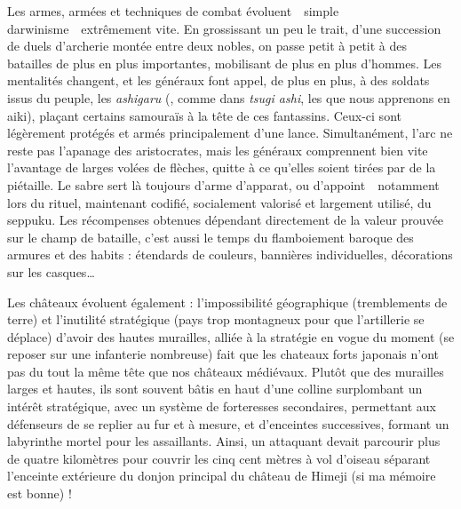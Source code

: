 Les armes, armées et techniques de combat évoluent~\incise~simple
darwinisme~\incise~extrêmement vite. En grossissant un peu le trait, d'une
succession de duels d'archerie montée entre deux nobles, on passe petit à petit
à des batailles de plus en plus importantes, mobilisant de plus en plus
d'hommes. Les mentalités changent, et les généraux font appel, de plus en plus,
à des soldats issus du peuple, les \emph{ashigaru} (, comme
dans \emph{tsugi ashi}, les  que nous apprenons en aiki),
plaçant certains samouraïs à la tête de ces fantassins. Ceux-ci sont légèrement
protégés et armés principalement d'une lance. Simultanément, l'arc ne reste pas
l'apanage des aristocrates, mais les généraux comprennent bien vite l'avantage
de larges volées de flèches, quitte à ce qu'elles soient tirées par de la
piétaille. Le sabre sert là toujours d'arme d'apparat, ou
d'appoint~\incise~notamment lors du rituel, maintenant codifié, socialement
valorisé et largement utilisé, du seppuku. Les récompenses obtenues dépendant
directement de la valeur prouvée sur le champ de bataille, c'est aussi le temps
du flamboiement baroque des armures et des habits : étendards de couleurs,
bannières individuelles, décorations sur les casques\dots

Les châteaux évoluent également : l'impossibilité géographique (tremblements de
terre) et l'inutilité stratégique (pays trop montagneux pour que l'artillerie
se déplace) d'avoir des hautes murailles, alliée à la stratégie en vogue du
moment (se reposer sur une infanterie nombreuse) fait que les chateaux forts
japonais n'ont pas du tout la même tête que nos châteaux médiévaux. Plutôt que
des murailles larges et hautes, ils sont souvent bâtis en haut d'une colline
surplombant un intérêt stratégique, avec un système de forteresses secondaires,
permettant aux défenseurs de se replier au fur et à mesure, et d'enceintes
successives, formant un labyrinthe mortel pour les assaillants. Ainsi, un
attaquant devait parcourir plus de quatre kilomètres pour couvrir les cinq cent
mètres à vol d'oiseau séparant l'enceinte extérieure du donjon principal du
château de Himeji (si ma mémoire est bonne) !

